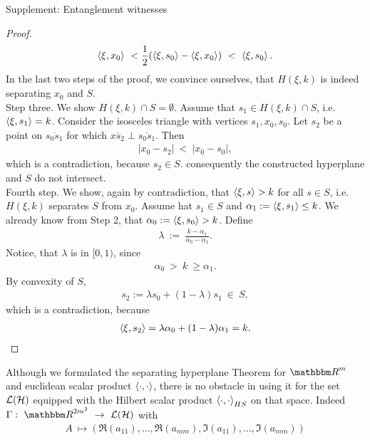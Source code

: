 \begin{section}{Supplement: Entanglement witnesses}
\begin{proof}
      \begin{align}
       \braket{\xi, x_0} \ < \frac{1}{2}(\braket{\xi,s_0} - \braket{\xi,x_0}) \ < \ \braket{\xi, s_0}.
      \end{align}
      In the last two steps of the proof, we convince ourselves, that $H(\xi, k)$ is indeed separating $x_0$ and $S$. \\
      Step three. We show $H(\xi,k) \cap S = \emptyset$. Assume that $s_1 \in H(\xi,k) \cap S$, i.e. $\braket{\xi,s_1} = k$. Consider the isosceles triangle with vertices $s_1,x_0,s_0$. Let $s_2$ be a point on
      $\overline{s_0s_1}$ for which $\overline{xs_2} \perp \overline{s_0s_1}$. Then 
      \begin{align}
       |x_0 - s_2| \ < \ |x_0-s_0|,
      \end{align}
      which is a contradiction, because $s_2 \in S$. consequently the constructed hyperplane and $S$ do not intersect. \\
      Fourth step. We show, again by contradiction, that $\braket{\xi, s} > k$ for all $s \in S$, i.e. $H(\xi, k)$ separates $S$ from $x_0$. Assume hat $s_1 \in S$ and $\alpha_1 := \braket{\xi,s_1} \leq k$. 
      We already know from Step 2, that $\alpha_0 := \braket{\xi,s_0} > k$. Define
      \begin{align}
       \lambda \ := \ \frac{k - \alpha_1}{\alpha_0 - \alpha_1}.
      \end{align}
      Notice, that $\lambda$ is in $[0,1)$, since
      \begin{align}
       \alpha_0 \ > \ k \ \geq \alpha_1.
      \end{align}
      By convexity of $S$, 
      \begin{align}
       s_2 := \lambda s_0 + (1-\lambda) s_1 \  \in \ S,
      \end{align}
      which is a contradiction, because
     \begin{align}
      \braket{\xi,s_2} = \lambda \alpha_0 + (1-\lambda) \alpha_1 = k.
     \end{align}      
     \end{proof}
     Although we formulated the separating hyperplane Theorem for $\bbmR^m$ and euclidean scalar product $\braket{\cdot,\cdot}$, there is no obstacle in using it for the set ${\mathcal L}({\mathcal H})$ equipped with the Hilbert scalar 
     product $\braket{\cdot,\cdot}_{HS}$ on that space. Indeed $\Gamma: \ \bbmR^{2m^2} \ \rightarrow \ \cL(\cH)$ with
     \begin{align}
      A \ \mapsto (\Re(a_{11}),\dots, \Re(a_{mm}),\Im(a_{11}), \dots, \Im(a_{mm}))

\end{align}
\end{section}
